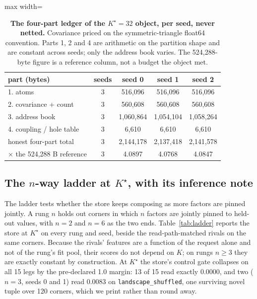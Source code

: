 \documentclass{article} %
\newcommand{\Kstar}{\ensuremath{K^{\star}}}
\begin{document}
\begin{table}[t]
\centering\small
\caption{\textbf{The four-part ledger of the $\Kstar=32$ object, per seed, never netted.}
Covariance priced on the symmetric-triangle float64 convention. Parts 1, 2 and 4 are
arithmetic on the partition shape and are constant across seeds; only the address book varies.
The 524,288-byte figure is a reference column, not a budget the object met.}
\label{tab:ledger-kstar}
\begin{adjustbox}{max width=\linewidth}\begin{tabular}{lcccc}
\toprule
part (bytes) & seeds & seed 0 & seed 1 & seed 2 \\
\midrule
1. atoms & 3 & 516,096 & 516,096 & 516,096 \\
2. covariance + count & 3 & 560,608 & 560,608 & 560,608 \\
3. address book & 3 & 1,060,864 & 1,054,104 & 1,058,264 \\
4. coupling / hole table & 3 & 6,610 & 6,610 & 6,610 \\
honest four-part total & 3 & 2,144,178 & 2,137,418 & 2,141,578 \\
$\times$ the 524,288 B reference & 3 & 4.0897 & 4.0768 & 4.0847 \\ %
\bottomrule
\end{tabular}\end{adjustbox}
\end{table}

\subsection{The $n$-way ladder at $\Kstar$, with its inference note}
\label{sec:ladder}

The ladder tests whether the store keeps composing as more factors are pinned jointly. A rung
$n$ holds out corners in which $n$ factors are jointly pinned to held-out values, with $n=2$ and
$n=6$ as the two ends. Table~\ref{tab:ladder} reports the store at $\Kstar$ on every rung and
seed, beside the read-path-matched rivals on the same corners. Because the rivals' features are
a function of the request alone and not of the rung's fit pool, their scores do not depend on
$K$; on rungs $n\ge3$ they are exactly constant by construction.
At $\Kstar$ the store's control gate collapses on all 15 legs by the pre-declared 1.0 margin:
13 of 15 read exactly 0.0000, and two ($n=3$, seeds 0 and 1) read 0.0083 on
\texttt{landscape\_shuffled}, one surviving novel tuple over 120 corners, which we print
rather than round away. %
\end{document}
